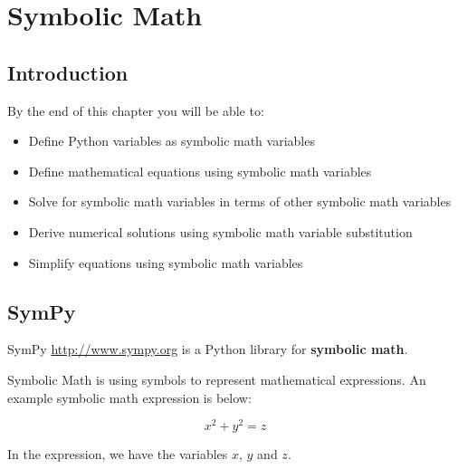 \documentclass{book}
\begin{document}
    
        \chapter{Symbolic Math}\label{symbolic-math}
    




    
        \section{Introduction}\label{introduction}
    




    
        By the end of this chapter you will be able to:

\begin{itemize}
\item
  Define Python variables as symbolic math variables
\item
  Define mathematical equations using symbolic math variables
\item
  Solve for symbolic math variables in terms of other symbolic math
  variables
\item
  Derive numerical solutions using symbolic math variable substitution
\item
  Simplify equations using symbolic math variables
\end{itemize}
    




    
        \section{SymPy}\label{sympy}
    




    
        SymPy \url{http://www.sympy.org} is a Python library for
\textbf{symbolic math}.

Symbolic Math is using symbols to represent mathematical expressions. An
example symbolic math expression is below:
    




    
        \[ x^{2} + y^{2} = z \]
    




    
        In the expression, we have the variables \(x\), \(y\) and \(z\).
    
\end{document}
